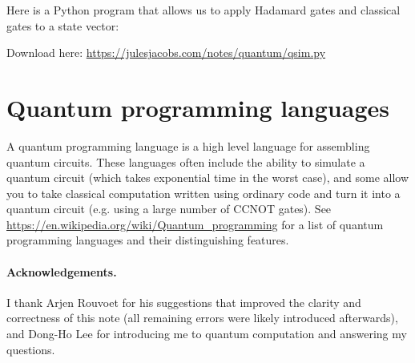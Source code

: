 Here is a Python program that allows us to apply Hadamard gates and classical gates to a state vector:


Download here: \url{https://julesjacobs.com/notes/quantum/qsim.py}

\section{Quantum programming languages}

A quantum programming language is a high level language for assembling quantum circuits.
These languages often include the ability to simulate a quantum circuit (which takes exponential time in the worst case),
and some allow you to take classical computation written using ordinary code and turn it into a quantum circuit (e.g. using a large number of CCNOT gates).
See \url{https://en.wikipedia.org/wiki/Quantum_programming} for a list of quantum programming languages and their distinguishing features.

\paragraph{Acknowledgements.}
I thank Arjen Rouvoet for his suggestions that improved the clarity and correctness of this note (all remaining errors were likely introduced afterwards),
and Dong-Ho Lee for introducing me to quantum computation and answering my questions.






